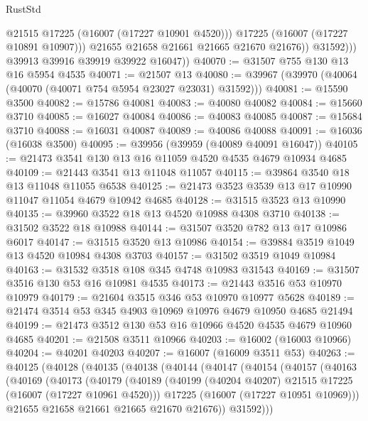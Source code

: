 \begin{lexlean}{RustStd}
\begin{coremodule}
                      @21515
                      @17225
                      (@16007 (@17227 @10901 @4520)))
                    @17225
                    (@16007 (@17227 @10891 @10907)))
                  @21655
                  @21658
                  @21661
                  @21665
                  @21670
                  @21676))
              @31592)))
        @39913
        @39916
        @39919
        @39922
        @16047))
@40070 := @31507 @755 @130 @13 @16 @5954 @4535
@40071 := @21507 @13
@40080 := @39967 (@39970 (@40064 (@40070 (@40071 @754 @5954 @23027 @23031) @31592)))
@40081 := @15590 @3500
@40082 := @15786 @40081
@40083 := @40080 @40082
@40084 := @15660 @3710
@40085 := @16027 @40084
@40086 := @40083 @40085
@40087 := @15684 @3710
@40088 := @16031 @40087
@40089 := @40086 @40088
@40091 := @16036 (@16038 @3500)
@40095 := @39956 (@39959 (@40089 @40091 @16047))
@40105 := @21473 @3541 @130 @13 @16 @11059 @4520 @4535 @4679 @10934 @4685
@40109 := @21443 @3541 @13 @11048 @11057
@40115 := @39864 @3540 @18 @13 @11048 @11055 @6538
@40125 := @21473 @3523 @3539 @13 @17 @10990 @11047 @11054 @4679 @10942 @4685
@40128 := @31515 @3523 @13 @10990
@40135 := @39960 @3522 @18 @13 @4520 @10988 @4308 @3710
@40138 := @31502 @3522 @18 @10988
@40144 := @31507 @3520 @782 @13 @17 @10986 @6017
@40147 := @31515 @3520 @13 @10986
@40154 := @39884 @3519 @1049 @13 @4520 @10984 @4308 @3703
@40157 := @31502 @3519 @1049 @10984
@40163 := @31532 @3518 @108 @345 @4748 @10983 @31543
@40169 := @31507 @3516 @130 @53 @16 @10981 @4535
@40173 := @21443 @3516 @53 @10970 @10979
@40179 := @21604 @3515 @346 @53 @10970 @10977 @5628
@40189 := @21474 @3514 @53 @345 @4903 @10969 @10976 @4679 @10950 @4685 @21494
@40199 := @21473 @3512 @130 @53 @16 @10966 @4520 @4535 @4679 @10960 @4685
@40201 := @21508 @3511 @10966
@40203 := @16002 (@16003 @10966)
@40204 := @40201 @40203
@40207 := @16007 (@16009 @3511 @53)
@40263 := @40125
    (@40128
      (@40135
        (@40138
          (@40144
            (@40147
              (@40154
                (@40157
                  (@40163
                    (@40169
                      (@40173
                        (@40179
                          (@40189
                            (@40199 (@40204 @40207) @21515 @17225 (@16007 (@17227 @10961 @4520)))
                            @17225
                            (@16007 (@17227 @10951 @10969)))
                          @21655
                          @21658
                          @21661
                          @21665
                          @21670
                          @21676))
                      @31592)))

\end{coremodule}
\end{lexlean}
